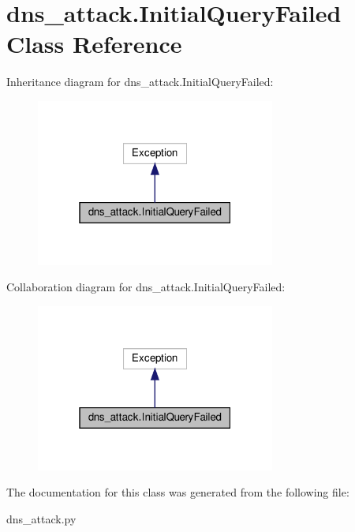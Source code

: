 \hypertarget{classdns__attack_1_1InitialQueryFailed}{}\section{dns\+\_\+attack.\+Initial\+Query\+Failed Class Reference}
\label{classdns__attack_1_1InitialQueryFailed}


Inheritance diagram for dns\+\_\+attack.\+Initial\+Query\+Failed\+:
\nopagebreak
\begin{figure}[H]
\begin{center}
\leavevmode
\includegraphics[width=223pt]{classdns__attack_1_1InitialQueryFailed__inherit__graph}
\end{center}
\end{figure}


Collaboration diagram for dns\+\_\+attack.\+Initial\+Query\+Failed\+:
\nopagebreak
\begin{figure}[H]
\begin{center}
\leavevmode
\includegraphics[width=223pt]{classdns__attack_1_1InitialQueryFailed__coll__graph}
\end{center}
\end{figure}


The documentation for this class was generated from the following file\+:\begin{DoxyCompactItemize}
\item 
dns\+\_\+attack.\+py\end{DoxyCompactItemize}
